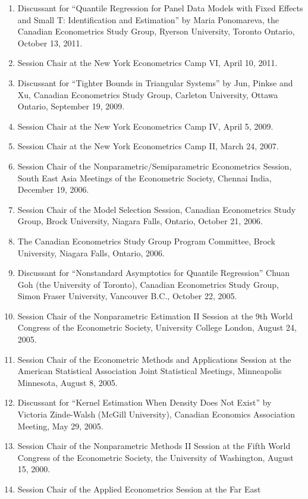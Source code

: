 \documentclass[
]{article}
\begin{document}
\begin{enumerate}
  2013.
\item
  Discussant for ``Quantile Regression for Panel Data Models with Fixed
  Effects and Small T: Identification and Estimation'' by Maria
  Ponomareva, the Canadian Econometrics Study Group, Ryerson University,
  Toronto Ontario, October 13, 2011.
\item
  Session Chair at the New York Econometrics Camp VI, April 10, 2011.
\item
  Discussant for ``Tighter Bounds in Triangular Systems'' by Jun, Pinkse
  and Xu, Canadian Econometrics Study Group, Carleton University, Ottawa
  Ontario, September 19, 2009.
\item
  Session Chair at the New York Econometrics Camp IV, April 5, 2009.
\item
  Session Chair at the New York Econometrics Camp II, March 24, 2007.
\item
  Session Chair of the Nonparametric/Semiparametric Econometrics
  Session, South East Asia Meetings of the Econometric Society, Chennai
  India, December 19, 2006.
\item
  Session Chair of the Model Selection Session, Canadian Econometrics
  Study Group, Brock University, Niagara Falls, Ontario, October 21,
  2006.
\item
  The Canadian Econometrics Study Group Program Committee, Brock
  University, Niagara Falls, Ontario, 2006.
\item
  Discussant for ``Nonstandard Asymptotics for Quantile Regression''
  Chuan Goh (the University of Toronto), Canadian Econometrics Study
  Group, Simon Fraser University, Vancouver B.C., October 22, 2005.
\item
  Session Chair of the Nonparametric Estimation II Session at the 9th
  World Congress of the Econometric Society, University College London,
  August 24, 2005.
\item
  Session Chair of the Econometric Methods and Applications Session at
  the American Statistical Association Joint Statistical Meetings,
  Minneapolis Minnesota, August 8, 2005.
\item
  Discussant for ``Kernel Estimation When Density Does Not Exist'' by
  Victoria Zinde-Walsh (McGill University), Canadian Economics
  Association Meeting, May 29, 2005.
\item
  Session Chair of the Nonparametric Methods II Session at the Fifth
  World Congress of the Econometric Society, the University of
  Washington, August 15, 2000.
\item
  Session Chair of the Applied Econometrics Session at the Far East

\end{enumerate}
\end{document}
